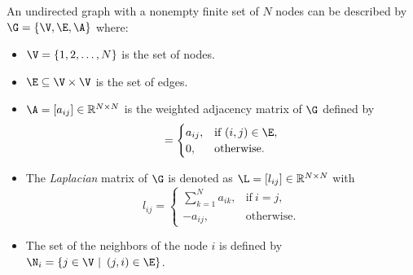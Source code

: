 An undirected graph with a nonempty finite set of $N$ nodes can be described by $\G =\{\V,\E,\A\}$ where:
\begin{itemize}
    \item $\V = \{1, 2, \dots, N\}$ is the set of nodes.
    \item $\E \subseteq \V \times \V$ is the set of edges.
    \item $\A = [a_{ij}] \in \mathbb{R}^{N \times N}$ is the weighted adjacency matrix of $\G$ defined by
    \begin{equation}
        [a_{ij}] = \begin{cases}
            a_{ij}, & \text{if}\ (i,j) \in \E , \\
            0, & \text{otherwise}.
        \end{cases}
    \end{equation}
    \item The {\it Laplacian} matrix of $\G$ is denoted as $\L = [l_{ij}] \in \mathbb{R}^{N \times N}$ with
    \begin{equation}
        l_{ij} = \begin{cases}
            \sum_{k=1}^{N}a_{ik}, & \text{if}\  i = j , \\
            -a_{ij}, & \text{otherwise}.
        \end{cases}
    \end{equation}
    \item The set of the neighbors of the node $i$ is defined by $\N_{i} =  \left\{j \in \V \ | \ \left( j, i \right) \in \E \right\}$.
\end{itemize}


